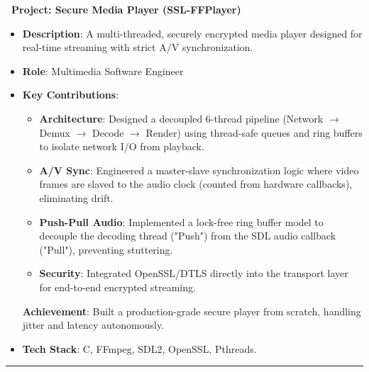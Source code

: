 \documentclass[letterpaper,10pt]{article}
\newenvironment{resume_list}{
  \vspace{-7pt}
  \begin{itemize}[itemsep=-2px, parsep=1pt, leftmargin=30pt]
}{
  \end{itemize}
}
\begin{document}
\begin{resume_list}
 
      \item \textbf{\faPlayCircle\ Project: Secure Media Player (SSL-FFPlayer)}
       \begin{itemize}[itemsep=1pt, leftmargin=15pt, label=-]
         \item \textbf{Description}: A multi-threaded, securely encrypted media player designed for real-time streaming with strict A/V synchronization.
         \item \textbf{Role}: Multimedia Software Engineer
         \item \textbf{Key Contributions}:
           \begin{itemize}[itemsep=0pt, leftmargin=10pt, label=$\circ$]
              \item \textbf{Architecture}: Designed a decoupled 6-thread pipeline (Network $\rightarrow$ Demux $\rightarrow$ Decode $\rightarrow$ Render) using thread-safe queues and ring buffers to isolate network I/O from playback.
              \item \textbf{A/V Sync}: Engineered a master-slave synchronization logic where video frames are slaved to the audio clock (counted from hardware callbacks), eliminating drift.
              \item \textbf{Push-Pull Audio}: Implemented a lock-free ring buffer model to decouple the decoding thread ("Push") from the SDL audio callback ("Pull"), preventing stuttering.
              \item \textbf{Security}: Integrated OpenSSL/DTLS directly into the transport layer for end-to-end encrypted streaming.
           \end{itemize}
         \textbf{Achievement}: Built a production-grade secure player from scratch, handling jitter and latency autonomously.
         \item \textbf{Tech Stack}: C, FFmpeg, SDL2, OpenSSL, Pthreads.
       \end{itemize}
   \end{resume_list}

  \vspace{5pt}\hrule\vspace{5pt}
\end{document}
